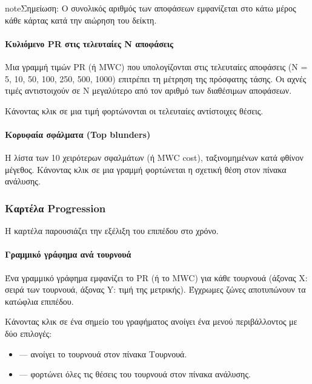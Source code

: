 \documentclass[letterpaper,10pt,greek]{sphinxmanual}
\begin{document}
\begin{sphinxadmonition}{note}{Σημείωση:}
\sphinxAtStartPar
Ο συνολικός αριθμός των αποφάσεων εμφανίζεται στο κάτω μέρος κάθε κάρτας κατά την αιώρηση του δείκτη.
\end{sphinxadmonition}


\paragraph{Κυλιόμενο PR στις τελευταίες N αποφάσεις}
\label{\detokenize{manuel:pr-glissant-sur-n-dernieres-decisions}}
\sphinxAtStartPar
Μια γραμμή τιμών PR (ή MWC) που υπολογίζονται στις τελευταίες  αποφάσεις (N = 5, 10, 50, 100, 250, 500, 1000) επιτρέπει τη μέτρηση της πρόσφατης τάσης. Οι αχνές τιμές αντιστοιχούν σε N μεγαλύτερο από τον αριθμό των διαθέσιμων αποφάσεων.

\sphinxAtStartPar
Κάνοντας κλικ σε μια τιμή φορτώνονται οι τελευταίες  αντίστοιχες θέσεις.


\paragraph{Κορυφαία σφάλματα (Top blunders)}
\label{\detokenize{manuel:top-blunders}}
\sphinxAtStartPar
Η λίστα των 10 χειρότερων σφαλμάτων (ή MWC cost), ταξινομημένων κατά φθίνον μέγεθος. Κάνοντας κλικ σε μια γραμμή φορτώνεται η σχετική θέση στον πίνακα ανάλυσης.


\subsubsection{Καρτέλα Progression}
\label{\detokenize{manuel:onglet-progression}}
\sphinxAtStartPar
Η καρτέλα  παρουσιάζει την εξέλιξη του επιπέδου στο χρόνο.


\paragraph{Γραμμικό γράφημα ανά τουρνουά}
\label{\detokenize{manuel:courbe-par-tournoi}}
\sphinxAtStartPar
Ένα γραμμικό γράφημα εμφανίζει το PR (ή το MWC) για κάθε τουρνουά (άξονας X: σειρά των τουρνουά, άξονας Y: τιμή της μετρικής). Έγχρωμες ζώνες αποτυπώνουν τα κατώφλια επιπέδου.

\sphinxAtStartPar
Κάνοντας κλικ σε ένα σημείο του γραφήματος ανοίγει ένα μενού περιβάλλοντος με δύο επιλογές:
\begin{itemize}
\item {} 
\sphinxAtStartPar
{} — ανοίγει το τουρνουά στον πίνακα Τουρνουά.

\item {} 
\sphinxAtStartPar
{} — φορτώνει όλες τις θέσεις του τουρνουά στον πίνακα ανάλυσης.

\end{itemize}
\end{document}
